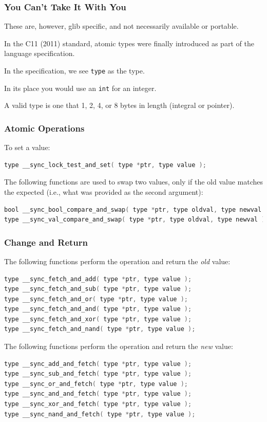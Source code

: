 \begin{frame}
	\frametitle{You Can't Take It With You}
	
	These are, however, glib specific, and not necessarily available or portable.
	
	In the C11 (2011) standard, atomic types were finally introduced as part of the language specification. 
	
	In the specification, we see \texttt{type} as the type.
	
	In its place you would use an \texttt{int} for an integer. 
	
	A valid type is one that 1, 2, 4, or 8 bytes in length (integral or pointer).

\end{frame}


\begin{frame}[fragile]
	\frametitle{Atomic Operations}

To set a value:
\begin{lstlisting}[language=C]
type __sync_lock_test_and_set( type *ptr, type value );
\end{lstlisting}


The following functions are used to swap two values, only if the old value matches the expected (i.e., what was provided as the second argument):

\begin{lstlisting}[language=C]
bool __sync_bool_compare_and_swap( type *ptr, type oldval, type newval );
type __sync_val_compare_and_swap( type *ptr, type oldval, type newval );
\end{lstlisting}


\end{frame}


\begin{frame}[fragile]
\frametitle{Change and Return}

The following functions perform the operation and return the \textit{old} value:
\begin{lstlisting}[language=C]
type __sync_fetch_and_add( type *ptr, type value );
type __sync_fetch_and_sub( type *ptr, type value );
type __sync_fetch_and_or( type *ptr, type value );
type __sync_fetch_and_and( type *ptr, type value );
type __sync_fetch_and_xor( type *ptr, type value );
type __sync_fetch_and_nand( type *ptr, type value );
\end{lstlisting}

The following functions perform the operation and return the \textit{new} value:
\begin{lstlisting}[language=C]
type __sync_add_and_fetch( type *ptr, type value );
type __sync_sub_and_fetch( type *ptr, type value );
type __sync_or_and_fetch( type *ptr, type value );
type __sync_and_and_fetch( type *ptr, type value );
type __sync_xor_and_fetch( type *ptr, type value );
type __sync_nand_and_fetch( type *ptr, type value );
\end{lstlisting}


\end{frame}



